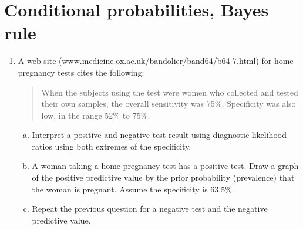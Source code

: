 \documentclass[12pt]{article}
\begin{document}
\section{Conditional probabilities, Bayes rule}
\begin{enumerate}[1.]
\item  A web site (www.medicine.ox.ac.uk/bandolier/band64/b64-7.html) for home pregnancy tests cites the following:
\begin{quote}
  When the subjects using the test were women who collected and tested
  their own samples, the overall sensitivity was 75\%. Specificity was
  also low, in the range 52\% to 75\%.
\end{quote}
\begin{enumerate}[a.]
\item Interpret a positive and negative test result using diagnostic
  likelihood ratios using both extremes of the specificity.
\item A woman taking a home pregnancy test has a positive test. Draw a
  graph of the positive predictive value by the prior probability
  (prevalence) that the woman is pregnant. Assume the specificity is 63.5\%
\item Repeat the previous question for a negative test and the negative
  predictive value.
\end{enumerate}


\end{enumerate}
\end{document}
